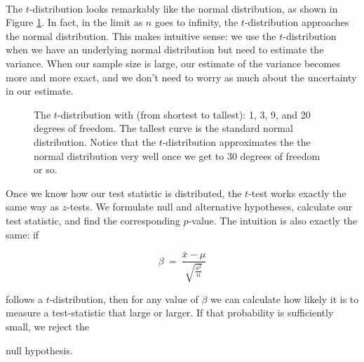 \ \\



The $t$-distribution looks remarkably like the normal distribution, as shown in Figure \ref{fig:tdistribution}. In fact, in the limit as $n$ goes to infinity, the $t$-distribution approaches the normal distribution. This makes intuitive sense: we use the $t$-distribution when we have an underlying normal distribution but need to estimate the variance. When our sample size is large, our estimate of the variance becomes more and more exact, and we don't need to worry as much about the uncertainty in our estimate.



\begin{figure}[h!]

\begin{center}


\caption{The $t$-distribution with (from shortest to tallest): 1, 3, 9, and 20 degrees of freedom.  The tallest curve is the standard normal distribution.  Notice that the $t$-distribution approximates the the normal distribution very well once we get to 30 degrees of freedom or so.}\label{fig:tdistribution}

\end{center}

\end{figure}





Once we know how our test statistic is distributed, the $t$-test   works exactly the same way as $z$-tests. We formulate null and alternative hypotheses, calculate our test statistic, and find the corresponding $p$-value. The intuition is also exactly the same: if

\begin{equation*}

\beta\ = \ \frac{\bar{x}-\mu}{\sqrt{\frac{s^{2}}{n}}}

\end{equation*}

follows a $t$-distribution, then for any value of $\beta$ we can calculate how likely it is to measure a test-statistic that large or larger. If that probability is sufficiently small, we reject the

null hypothesis.



